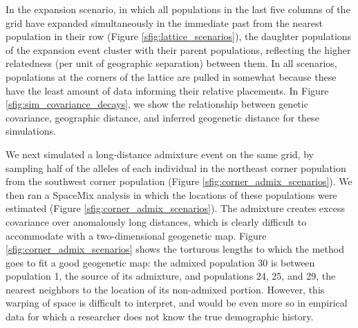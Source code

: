\documentclass[12pt]{article}
\begin{document}
In the expansion scenario, in which all populations in the last five columns of the grid have expanded simultaneously in the immediate past from the nearest population in their row (Figure \ref{sfig:lattice_scenarios}), 
the daughter populations of the expansion event cluster with their parent populations, reflecting the higher relatedness (per unit of geographic separation) between them.  
In all scenarios, populations at the corners of the lattice are pulled in somewhat
because these have the least amount of data informing their relative placements.
In Figure \ref{sfig:sim_covariance_decays}, we show the relationship between genetic covariance, geographic distance, and inferred geogenetic distance for these simulations.

We next simulated a long-distance admixture event on the same grid,
by sampling half of the alleles of each individual in the northeast corner population from the southwest corner population (Figure \ref{sfig:corner_admix_scenarios}).  We then ran a SpaceMix analysis in which the locations of these populations were estimated (Figure \ref{sfig:corner_admix_scenarios}).
The admixture creates excess covariance over anomalously long distances, which is clearly difficult to accommodate with a two-dimensional geogenetic map.
Figure \ref{sfig:corner_admix_scenarios} shows the torturous lengths to which the method goes to fit a good geogenetic map: the admixed population 30 is between population 1, the source of its admixture, and populations 24, 25, and 29, the nearest neighbors to the location of its non-admixed portion.
However, this warping of space is difficult to interpret, and would be even more so in empirical data for which a researcher does not know the true demographic history.  
\end{document}
